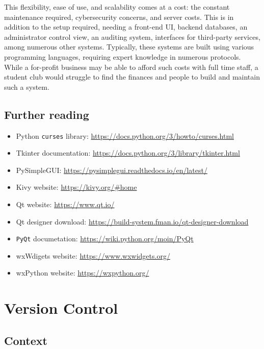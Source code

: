 \documentclass[11pt]{article}
\begin{document}
This flexibility, ease of use, and scalability comes at a cost: the constant maintenance required, cybersecurity concerns, and server costs. This is in addition to the setup required, needing a front-end UI, backend databases, an administrator control view, an auditing system, interfaces for third-party services, among numerous other systems. Typically, these systems are built using various programming languages, requiring expert knowledge in numerous protocols. While a for-profit business may be able to afford such costs with full time staff, a student club would struggle to find the finances and people to build and maintain such a system.

\subsection{Further reading}

\begin{itemize}
    \item Python \texttt{curses} library: \url{https://docs.python.org/3/howto/curses.html}
    \item Tkinter documentation: \url{https://docs.python.org/3/library/tkinter.html}
    \item PySimpleGUI: \url{https://pysimplegui.readthedocs.io/en/latest/}
    \item Kivy website: \url{https://kivy.org/#home}
    \item Qt website: \url{https://www.qt.io/}
    \item Qt designer download: \url{https://build-system.fman.io/qt-designer-download}
    \item \texttt{PyQt} documetation: \url{https://wiki.python.org/moin/PyQt}
    \item wxWdigets website: \url{https://www.wxwidgets.org/}
    \item wxPython website: \url{https://wxpython.org/}
\end{itemize}

\newpage

\section{Version Control}

\subsection{Context}
\end{document}

